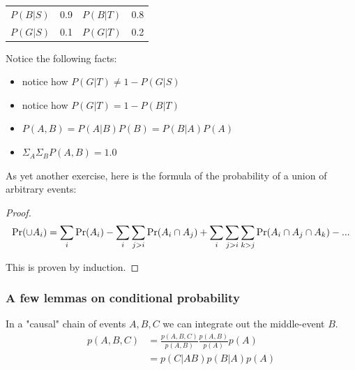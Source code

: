 \begin{table}[H]
    \centering
    \begin{tabular}{llll}
        $P(B|S)$ & 0.9 & $P(B|T)$ & 0.8 \\
        $P(G|S)$ & 0.1 & $P(G|T)$ & 0.2 
    \end{tabular}
\end{table}

Notice the following facts:
\begin{itemize}
    \item notice how $P(G|T) \neq 1 - P(G|S)$
    \item notice how $P(G|T) = 1 - P(B|T)$
    \item $P(A, B) = P(A|B) P(B) = P(B|A) P(A)$
    \item $ \Sigma_A \Sigma_B P(A, B) = 1.0 $
\end{itemize}

As yet another exercise, here is the formula of the probability of a union of arbitrary events: 

\begin{proof}
    $$ \operatorname{Pr} (\cup A_i) = \sum_i \operatorname{Pr}(A_i) 
            - \sum_i \sum_{j>i} \operatorname{Pr}(A_i \cap A_j) 
            + \sum_i \sum_{j>i} \sum_{k>j} \operatorname{Pr}(A_i \cap A_j \cap A_k) 
            - ...  $$
    
    This is proven by induction. 
                
    
    
\end{proof}

\subsubsection{A few lemmas on conditional probability} \label{condPropLemmas}

In a "causal" chain of events $A, B, C$ we can integrate out the middle-event $B$.
\begin{equation}
    \begin{aligned}
        p(A, B, C)  &= \frac{p(A, B, C)}{p(A, B)} \frac{p(A, B)}{p(A)} p(A) \\
                    &= p(C|AB) p(B|A) p(A) \\
    \end{aligned}
\end{equation}

